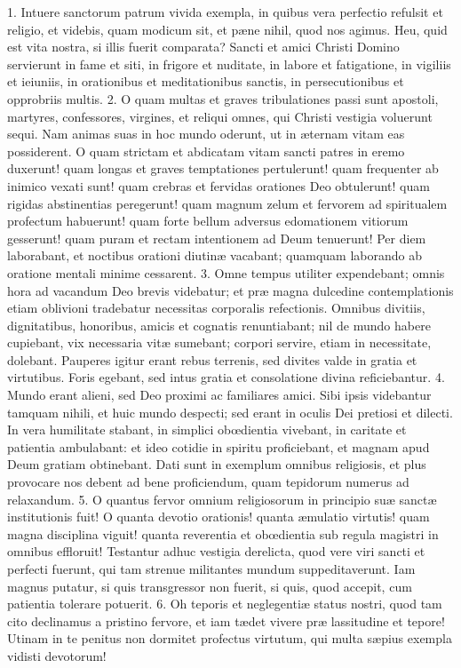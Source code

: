 \documentclass[twoside]{article}
\begin{document}
1. Intuere sanctorum patrum vivida exempla, in quibus vera perfectio refulsit et religio, et videbis, quam modicum sit, et pæne nihil, quod nos agimus. Heu, quid est vita nostra, si illis fuerit comparata? Sancti et amici Christi Domino servierunt in fame et siti, in frigore et nuditate, in labore et fatigatione, in vigiliis et ieiuniis, in orationibus et meditationibus sanctis, in persecutionibus et opprobriis multis.
2. O quam multas et graves tribulationes passi sunt apostoli, martyres, confessores, virgines, et reliqui omnes, qui Christi vestigia voluerunt sequi. Nam animas suas in hoc mundo oderunt, ut in æternam vitam eas possiderent. O quam strictam et abdicatam vitam sancti patres in eremo duxerunt! quam longas et graves temptationes pertulerunt! quam frequenter ab inimico vexati sunt! quam crebras et fervidas orationes Deo obtulerunt! quam rigidas abstinentias peregerunt! quam magnum zelum et fervorem ad spiritualem profectum habuerunt! quam forte bellum adversus edomationem vitiorum gesserunt! quam puram et rectam intentionem ad Deum tenuerunt! Per diem laborabant, et noctibus orationi diutinæ vacabant; quamquam laborando ab oratione mentali minime cessarent.
3. Omne tempus utiliter expendebant; omnis hora ad vacandum Deo brevis videbatur; et præ magna dulcedine contemplationis etiam oblivioni tradebatur necessitas corporalis refectionis. Omnibus divitiis, dignitatibus, honoribus, amicis et cognatis renuntiabant; nil de mundo habere cupiebant, vix necessaria vitæ sumebant; corpori servire, etiam in necessitate, dolebant. Pauperes igitur erant rebus terrenis, sed divites valde in gratia et virtutibus. Foris egebant, sed intus gratia et consolatione divina reficiebantur.
4. Mundo erant alieni, sed Deo proximi ac familiares amici. Sibi ipsis videbantur tamquam nihili, et huic mundo despecti; sed erant in oculis Dei pretiosi et dilecti. In vera humilitate stabant, in simplici obœdientia vivebant, in caritate et patientia ambulabant: et ideo cotidie in spiritu proficiebant, et magnam apud Deum gratiam obtinebant. Dati sunt in exemplum omnibus religiosis, et plus provocare nos debent ad bene proficiendum, quam tepidorum numerus ad relaxandum.
5. O quantus fervor omnium religiosorum in principio suæ sanctæ institutionis fuit! O quanta devotio orationis! quanta æmulatio virtutis! quam magna disciplina viguit! quanta reverentia et obœdientia sub regula magistri in omnibus effloruit! Testantur adhuc vestigia derelicta, quod vere viri sancti et perfecti fuerunt, qui tam strenue militantes mundum suppeditaverunt. Iam magnus putatur, si quis transgressor non fuerit, si quis, quod accepit, cum patientia tolerare potuerit.
6. Oh teporis et neglegentiæ status nostri, quod tam cito declinamus a pristino fervore, et iam tædet vivere præ lassitudine et tepore! Utinam in te penitus non dormitet profectus virtutum, qui multa sæpius exempla vidisti devotorum!
\end{document}
